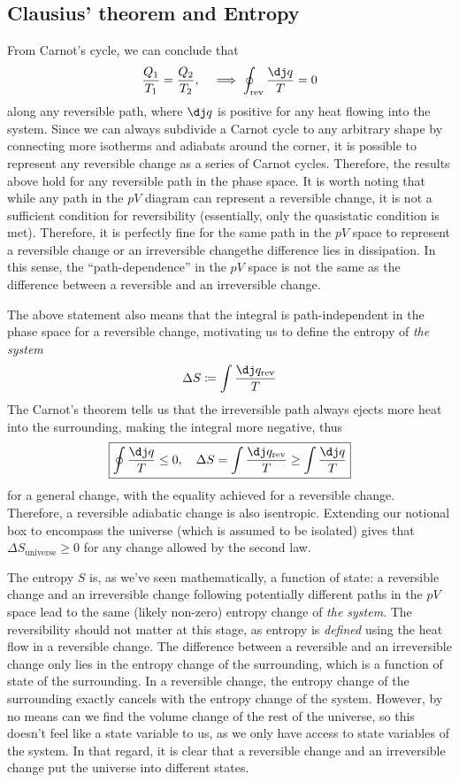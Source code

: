 \documentclass{article}
\theoremstyle{nonumberplain}
\begin{document}
\subsection{Clausius' theorem and Entropy}
From Carnot's cycle, we can conclude that 
\[
    \frac{Q_1}{T_1} = \frac{Q_2}{T_2},
    \quad \implies 
    \oint_{\mathrm{rev} } \frac{\dj q}{T}= 0
\]
along any reversible path, where $\dj q$ is positive for any heat flowing into the system. Since we can always subdivide a Carnot cycle to any arbitrary shape by connecting more isotherms and adiabats around the corner, it is possible to represent any reversible change as a series of Carnot cycles. Therefore, the results above hold for any reversible path in the phase space. It is worth noting that while any path in the $pV$ diagram can represent a reversible change, it is not a sufficient condition for reversibility (essentially, only the quasistatic condition is met). Therefore, it is perfectly fine for the same path in the $pV$ space to represent a reversible change or an irreversible change\textemdash the difference lies in dissipation. In this sense, the ``path-dependence'' in the $pV$ space is not the same as the difference between a reversible and an irreversible change.

The above statement also means that the integral is path-independent in the phase space for a reversible change, motivating us to define the entropy of \textit{the system}
\[
    \Delta S \coloneqq \int \frac{\dj q_{\mathrm{rev} }}{T}
\]
The Carnot's theorem tells us that the irreversible path always ejects more heat into the surrounding, making the integral more negative, thus
\[
    \boxed{\oint \frac{\dj q}{T} \leq 0, \quad 
    \Delta S = \int \frac{\dj q_{\mathrm{rev} }}{T} \geq  \int \frac{\dj q}{T}}
\]
for a general change, with the equality achieved for a reversible change. Therefore, a reversible adiabatic change is also isentropic. Extending our notional box to encompass the universe (which is assumed to be isolated) gives that \(\Delta S_{\mathrm{universe}} \geq 0\) for any change allowed by the second law. 

The entropy $S$ is, as we've seen mathematically, a function of state: a reversible change and an irreversible change following potentially different paths in the $pV$ space lead to the same (likely non-zero) entropy change of \textit{the system}. The reversibility should not matter at this stage, as entropy is \textit{defined} using the heat flow in a reversible change. The difference between a reversible and an irreversible change only lies in the entropy change of the surrounding, which is a function of state of the surrounding. In a reversible change, the entropy change of the surrounding exactly cancels with the entropy change of the system. However, by no means can we find the volume change of the rest of the universe, so this doesn't feel like a state variable to us, as we only have access to state variables of the system. In that regard, it is clear that a reversible change and an irreversible change put the universe into different states. 
\end{document}
